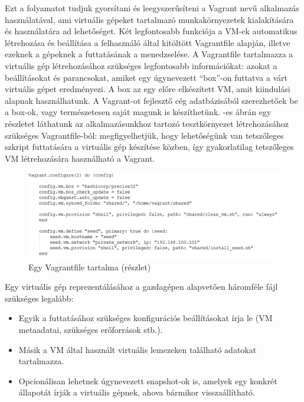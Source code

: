 Ezt a folyamatot tudjuk gyorsítani és leegyszerűsíteni a Vagrant\cite{vagrant} nevű alkalmazás használatával, ami virtuális gépeket tartalmazó munkakörnyezetek kialakítására és használatára ad lehetőséget. Két legfontosabb funkciója a VM-ek automatikus létrehozása és beállítása a felhasználó által kitöltött Vagrantfile alapján, illetve ezeknek a gépeknek a futtatásának a menedzselése. A Vagrantfile tartalmazza a virtuális gép létrehozásához szükséges legfontosabb információkat: azokat a beállításokat és parancsokat, amiket egy úgynevezett ``box''-on futtatva a várt virtuális gépet eredményezi. A box az egy előre elkészített VM, amit kiindulási alapnak használhatunk. A Vagrant-ot fejlesztő cég adatbázisából\cite{atlas} szerezhetőek be a box-ok, vagy természetesen saját magunk is készíthetünk. -es ábrán egy részletet láthatunk az alkalmazásunkhoz tartozó tesztkörnyezet létrehozásához szükséges Vagrantfile-ból: megfigyelhetjük, hogy lehetőségünk van tetszőleges szkript futtatására a virtuális gép készítése közben, így gyakorlatilag tetszőleges VM létrehozására használható a Vagrant.

\begin{figure}[ht]
	\centering
	\includegraphics[width=140mm, keepaspectratio]{figures/vagrantfile.png}
	\caption{Egy Vagrantfile tartalma (részlet)}
	\label{fig:vagrantfile}
\end{figure}

Egy virtuális gép reprezentálásához a gazdagépen alapvetően háromféle fájl szükséges legalább:

\begin{itemize}
	\item Egyik a futtatásához szükséges konfigurációs beállításokat írja le (VM metaadatai, szükséges erőforrások stb.).
	\item Másik a VM által használt virtuális lemezeken található adatokat tartalmazza.
	\item Opcionálisan lehetnek úgynevezett snapshot-ok is, amelyek egy konkrét állapotát írják a virtuális gépnek, ahova bármikor visszaállítható.
\end{itemize}

